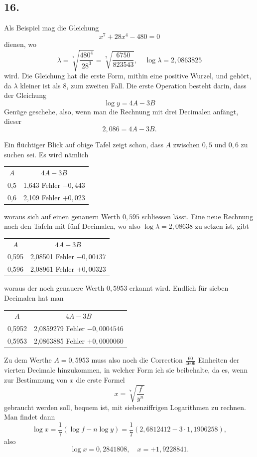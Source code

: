 \documentclass[12pt,a4paper]{article}
\newcommand{\1}{\ensuremath{\mathrlap{\,|\,}}} %
\begin{document}
\subsection*{16.}

Als Beispiel mag die Gleichung
\[x^7 + 28x^4 - 480 = 0\]
dienen, wo
\[\lambda = \sqrt[7]{\frac{480^4}{28^3}} = \sqrt[7]{\frac{6750}{823543}},\quad \log\lambda = 2{,}0863825\]
wird. Die Gleichung hat die erste Form, mithin eine positive Wurzel, und gehört, da $\lambda$ kleiner ist als $8$, zum zweiten Fall. Die erste Operation besteht darin, dass der Gleichung
\[\log y = 4A - 3B\]
Genüge geschehe, also, wenn man die Rechnung mit drei Decimalen anfängt, dieser
\[2{,}086 = 4A - 3B.\]

Ein flüchtiger Blick auf obige Tafel zeigt schon, dass $A$ zwischen $0{,}5$ und $0{,}6$ zu suchen sei. Es wird nämlich
\begin{center}
\begin{tabular}{cc}
$A$ & $4A - 3B$ \\
0,5 & 1,643 \quad Fehler $-0{,}443$ \\
0,6 & 2,109 \quad Fehler $+0{,}023$
\end{tabular}
\end{center}
woraus sich auf einen genauern Werth $0{,}595$ schliessen lässt. Eine neue Rechnung nach den Tafeln mit fünf Decimalen, wo also $\log\lambda = 2{,}08638$ zu setzen ist, gibt
\begin{center}
\begin{tabular}{cc}
$A$ & $4A - 3B$ \\
0,595 & 2,08501 \quad Fehler $-0{,}00137$ \\
0,596 & 2,08961 \quad Fehler $+0{,}00323$
\end{tabular}
\end{center}
woraus der noch genauere Werth $0{,}5953$ erkannt wird. Endlich für sieben Decimalen hat man
\begin{center}
\begin{tabular}{cc}
$A$ & $4A - 3B$ \\
0,5952 & 2,0859279 \quad Fehler $-0{,}0004546$ \\
0,5953 & 2,0863885 \quad Fehler $+0{,}0000060$
\end{tabular}
\end{center}

Zu dem Werthe $A = 0{,}5953$ muss also noch die Correction $\frac{60}{4606}$ Einheiten der vierten Decimale hinzukommen, in welcher Form ich sie beibehalte, da es, wenn zur Bestimmung von $x$ die erste Formel
\[x = \sqrt[7]{\frac{f}{y^n}}\]
gebraucht werden soll, bequem ist, mit siebenziffrigen Logarithmen zu rechnen. Man findet dann
\[\log x = \frac{1}{7}(\log f - n\log y) = \frac{1}{7}(2{,}6812412 - 3 \cdot 1{,}1906258),\]
also
\[\log x = 0{,}2841808,\quad x = +1{,}9228841.\]
\end{document}
